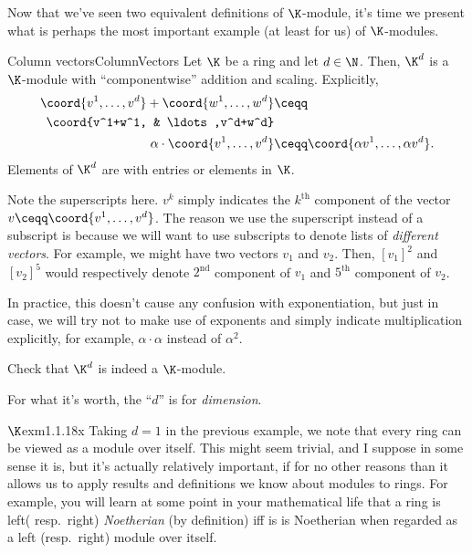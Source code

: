 Now that we've seen two equivalent definitions of $\K$-module, it's time we present what is perhaps the most important example (at least for us) of $\K$-modules.
\begin{exm}{Column vectors}{ColumnVectors}
	Let $\K$ be a ring and let $d\in \N$.  Then, $\K ^d$ is a $\K$-module with ``componentwise'' addition and scaling.  Explicitly,
	\begin{subequations}
		\begin{align}
			\coord{v^1,\ldots ,v^d}+\coord{w^1,\ldots ,w^d} & \ceqq \\
			\coord{v^1+w^1, & \ldots ,v^d+w^d}\notag \\
			\alpha \cdot \coord{v^1,\ldots ,v^d} & \ceqq \coord{\alpha v^1,\ldots ,\alpha v^d}.
		\end{align}
	\end{subequations}
	Elements of $\K ^d$ are  with entries or elements in $\K$.
	\begin{rmk}
		Note the superscripts here.  $v^k$ simply indicates the $k^{\text{th}}$ component of the vector $v\ceqq \coord{v^1,\ldots ,v^d}$.  The reason we use the superscript instead of a subscript is because we will want to use subscripts to denote lists of \emph{different vectors}.  For example, we might have two vectors $v_1$ and $v_2$.  Then, $[v_1]^2$ and $[v_2]^5$ would respectively denote $2^{\text{nd}}$ component of $v_1$ and $5^{\text{th}}$ component of $v_2$.
		
		In practice, this doesn't cause any confusion with exponentiation, but just in case, we will try not to make use of exponents and simply indicate multiplication explicitly, for example, $\alpha \cdot \alpha$ instead of $\alpha ^2$.
	\end{rmk}
	\begin{exr}[breakable=false]{}{}
		Check that $\K ^d$ is indeed a $\K$-module.
	\end{exr}
	\begin{rmk}
		For what it's worth, the ``$d$'' is for \emph{dimension}.
	\end{rmk}
\end{exm}
\begin{exm}{$\K$}{exm1.1.18x}
	Taking $d=1$ in the previous example, we note that every ring can be viewed as a module over itself.  This might seem trivial, and I suppose in some sense it is, but it's actually relatively important, if for no other reasons than it allows us to apply results and definitions we know about modules to rings.  For example, you will learn at some point in your mathematical life that a ring is left( resp.~right) \emph{Noetherian} (by definition) iff is is Noetherian when regarded as a left (resp.~right) module over itself.
\end{exm}
